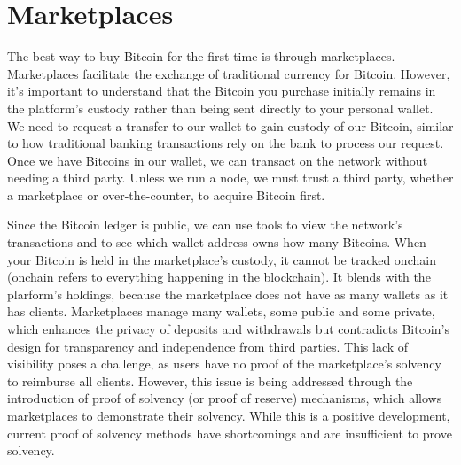 \section{Marketplaces}
The best way to buy Bitcoin for the first time is through marketplaces. Marketplaces facilitate the exchange of traditional currency for Bitcoin.
However, it's important to understand that the Bitcoin you purchase initially remains in the platform's custody rather than being sent directly to your personal wallet.
We need to request a transfer to our wallet to gain custody of our Bitcoin, similar to how traditional banking transactions rely on the bank to process our request.
Once we have Bitcoins in our wallet, we can transact on the network without needing a third party.
Unless we run a node, we must trust a third party, whether a marketplace or over-the-counter, to acquire Bitcoin first.

Since the Bitcoin ledger is public, we can use tools to view the network's transactions and to see which wallet address owns how many Bitcoins. 
When your Bitcoin is held in the marketplace's custody, it cannot be tracked onchain (onchain refers to everything happening in the blockchain). 
It blends with the plarform's holdings, because the marketplace does not have as many wallets as it has clients.
Marketplaces manage many wallets, some public and some private, which enhances the privacy of deposits and withdrawals but contradicts Bitcoin's design for transparency and independence from third parties. 
This lack of visibility poses a challenge, as users have no proof of the marketplace's solvency to reimburse all clients. 
However, this issue is being addressed through the introduction of proof of solvency (or proof of reserve) mechanisms, 
which allows marketplaces to demonstrate their solvency. 
While this is a positive development, current proof of solvency methods have shortcomings and are insufficient to prove solvency.



